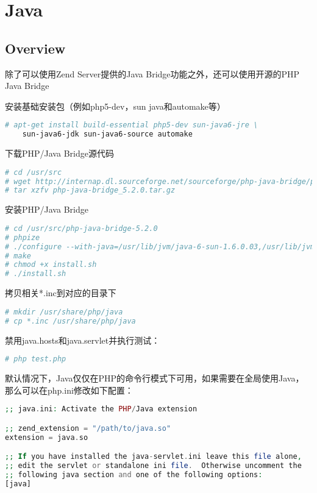 \part{Java}


\chapter{Overview}

除了可以使用Zend Server提供的Java Bridge功能之外，还可以使用开源的PHP Java Bridge

安装基础安装包（例如php5-dev，sun java和automake等）

\begin{lstlisting}[language=bash]
# apt-get install build-essential php5-dev sun-java6-jre \
    sun-java6-jdk sun-java6-source automake
\end{lstlisting}


下载PHP/Java Bridge源代码

\begin{lstlisting}[language=PHP]
# cd /usr/src
# wget http://internap.dl.sourceforge.net/sourceforge/php-java-bridge/php-java-bridge_5.2.0.tar.gz
# tar xzfv php-java-bridge_5.2.0.tar.gz
\end{lstlisting}

安装PHP/Java Bridge


\begin{lstlisting}[language=PHP]
# cd /usr/src/php-java-bridge-5.2.0
# phpize
# ./configure --with-java=/usr/lib/jvm/java-6-sun-1.6.0.03,/usr/lib/jvm/java-6-sun-1.6.0.03
# make
# chmod +x install.sh
# ./install.sh
\end{lstlisting}

拷贝相关*.inc到对应的目录下

\begin{lstlisting}[language=PHP]
# mkdir /usr/share/php/java
# cp *.inc /usr/share/php/java
\end{lstlisting}



禁用java.hosts和java.servlet并执行测试：




\begin{lstlisting}[language=PHP]
# php test.php
\end{lstlisting}

默认情况下，Java仅仅在PHP的命令行模式下可用，如果需要在全局使用Java，那么可以在php.ini修改如下配置：

\begin{lstlisting}[language=PHP]
;; java.ini: Activate the PHP/Java extension

;; zend_extension = "/path/to/java.so"
extension = java.so

;; If you have installed the java-servlet.ini leave this file alone,
;; edit the servlet or standalone ini file.  Otherwise uncomment the
;; following java section and one of the following options:
[java]
\end{lstlisting}


